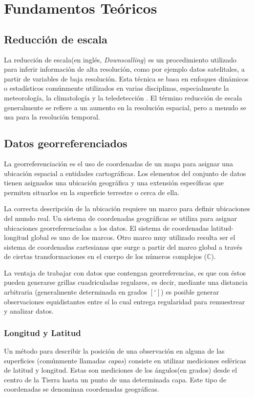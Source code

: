 \chapter{Fundamentos Teóricos}
\label{C2}
\section{Reducción de escala}
La reducción de escala(en inglés, \textit{Downscalling}) es un procedimiento utilizado para inferir 
información de alta resolución, como por ejemplo datos satelitales, a partir de variables de baja 
resolución. Esta técnica se basa en enfoques dinámicos o estadísticos comúnmente utilizados en varias 
disciplinas, especialmente la meteorología, la climatología y la teledetección . El término reducción 
de escala generalmente se refiere a un aumento en la resolución espacial, pero a menudo se usa para la 
resolución temporal.
%
%
%
%
\section{Datos georreferenciados}
La georreferenciación es el uso de coordenadas de un mapa para asignar una ubicación espacial a entidades
cartográficas. Los elementos del conjunto de datos tienen asignados una ubicación geográfica y una extensión específicas
que permiten situarlos en la superficie terrestre o cerca de ella.

La correcta descripción de la ubicación requiere un marco para definir ubicaciones del mundo real. Un sistema de coordenadas geográficas
se utiliza para asignar ubicaciones georreferenciadas a los datos. El sistema de coordenadas latitud-longitud global es uno de los marcos.
Otro marco muy utilizado resulta ser el sistema de coordenadas cartesianas que surge a partir del marco global a través de ciertas transformaciones
en el cuerpo de los números complejos ($\mathbb{C}$).

La ventaja de trabajar con datos que contengan georreferencias, es que con éstos pueden generarse grillas cuadriculadas regulares, es decir, mediante una distancia arbitraria (generalmente determinada en grados $[^{\circ}]$)
es posible generar observaciones equidistantes entre sí lo cual entrega regularidad para remuestrear y analizar datos.

    \subsection{Longitud y Latitud}
    Un método para describir la posición de una observación en alguna de las superficies (comúnmente llamadas \textit{capas}) consiste en utilizar 
    mediciones esféricas de latitud y longitud. Estas son mediciones de los ángulos(en grados) desde el centro de la Tierra hasta un punto de una determinada
    capa. Este tipo de coordenadas se denominan coordenadas geográficas.


